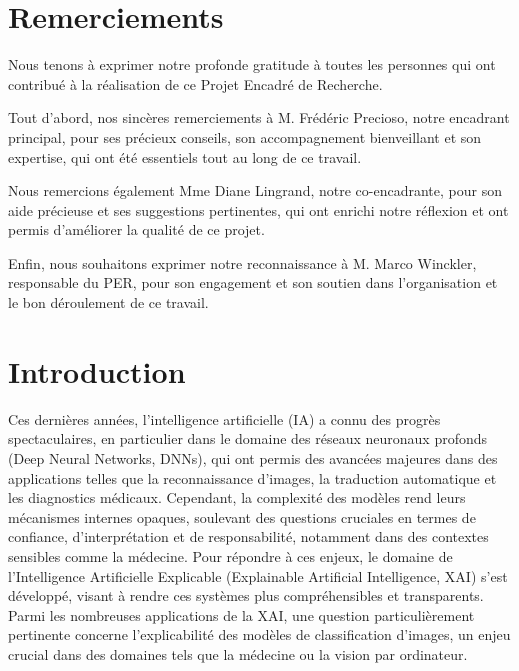 \documentclass[runningheads]{llncs}
\begin{document}
\newpage

\section*{Remerciements}

Nous tenons à exprimer notre profonde gratitude à toutes les personnes qui ont contribué à la réalisation de ce Projet Encadré de Recherche.

Tout d’abord, nos sincères remerciements à M. Frédéric Precioso, notre encadrant principal, pour ses précieux conseils, son accompagnement bienveillant et son expertise, qui ont été essentiels tout au long de ce travail.

Nous remercions également Mme Diane Lingrand, notre co-encadrante, pour son aide précieuse et ses suggestions pertinentes, qui ont enrichi notre réflexion et ont permis d’améliorer la qualité de ce projet.

Enfin, nous souhaitons exprimer notre reconnaissance à M. Marco Winckler, responsable du PER, pour son engagement et son soutien dans l’organisation et le bon déroulement de ce travail.


\section{Introduction}

Ces dernières années, l'intelligence artificielle (IA) a connu des progrès spectaculaires, en particulier dans le domaine des réseaux neuronaux profonds (Deep Neural Networks, DNNs), qui ont permis des avancées majeures dans des applications telles que la reconnaissance d’images, la traduction automatique et les diagnostics médicaux. Cependant, la complexité des modèles rend leurs mécanismes internes opaques, soulevant des questions cruciales en termes de confiance, d’interprétation et de responsabilité, notamment dans des contextes sensibles comme la médecine. Pour répondre à ces enjeux, le domaine de l’Intelligence Artificielle Explicable (Explainable Artificial Intelligence, XAI) s’est développé, visant à rendre ces systèmes plus compréhensibles et transparents. Parmi les nombreuses applications de la XAI, une question particulièrement pertinente concerne l’explicabilité des modèles de classification d’images, un enjeu crucial dans des domaines tels que la médecine ou la vision par ordinateur. 
\bigskip
\end{document}
